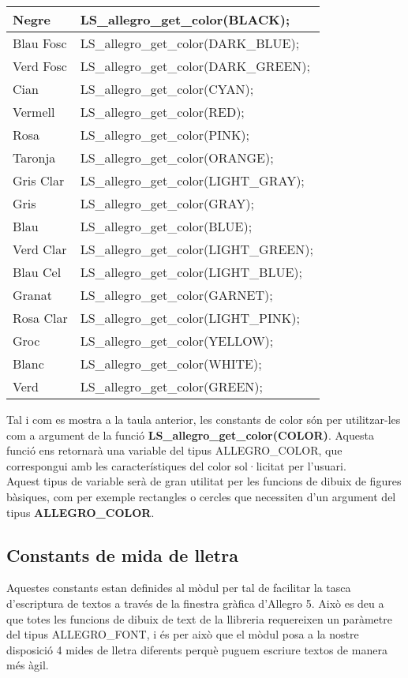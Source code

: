 \documentclass[11pt]{article}
\begin{document}
\begin{center}
\begin{tabular}{| l | l |}
\hline
Negre & LS\_allegro\_get\_color(BLACK); \\
\hline
Blau Fosc & LS\_allegro\_get\_color(DARK\_BLUE); \\
\hline
Verd Fosc & LS\_allegro\_get\_color(DARK\_GREEN); \\
\hline
Cian & LS\_allegro\_get\_color(CYAN); \\
\hline
Vermell & LS\_allegro\_get\_color(RED); \\
\hline
Rosa & LS\_allegro\_get\_color(PINK); \\
\hline
Taronja & LS\_allegro\_get\_color(ORANGE); \\
\hline
Gris Clar & LS\_allegro\_get\_color(LIGHT\_GRAY); \\
\hline
Gris & LS\_allegro\_get\_color(GRAY); \\
\hline
Blau & LS\_allegro\_get\_color(BLUE); \\
\hline
Verd Clar & LS\_allegro\_get\_color(LIGHT\_GREEN); \\
\hline
Blau Cel & LS\_allegro\_get\_color(LIGHT\_BLUE); \\
\hline
Granat & LS\_allegro\_get\_color(GARNET); \\
\hline
Rosa Clar & LS\_allegro\_get\_color(LIGHT\_PINK); \\
\hline
Groc & LS\_allegro\_get\_color(YELLOW); \\
\hline
Blanc & LS\_allegro\_get\_color(WHITE); \\
\hline
Verd & LS\_allegro\_get\_color(GREEN); \\
\hline  
\end{tabular}
\end{center}

\noindent Tal i com es mostra a la taula anterior, les constants de color són per utilitzar-les com a argument de la funció \textbf{LS\_allegro\_get\_color(COLOR)}. Aquesta funció ens retornarà una variable del tipus ALLEGRO\_COLOR, que correspongui amb les característiques del color sol·licitat per l'usuari.\\ Aquest tipus de variable serà de gran utilitat per les funcions de dibuix de figures bàsiques, com per exemple rectangles o cercles que necessiten d'un argument del tipus \textbf{ALLEGRO\_COLOR}.

\subsection{Constants de mida de lletra}
Aquestes constants estan definides al mòdul per tal de facilitar la tasca d'escriptura de textos a través de la finestra gràfica d'Allegro 5. Això es deu a que totes les funcions de dibuix de text de la llibreria requereixen un paràmetre del tipus ALLEGRO\_FONT, i és per això que el mòdul posa a la nostre disposició 4 mides de lletra diferents perquè puguem escriure textos de manera més àgil.
\end{document}
